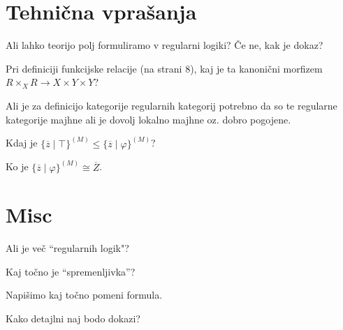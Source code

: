 \documentclass[12pt,a4paper]{article}
\newcommand\ans{\item[\textbf{A:}]}
\begin{document}
    \section*{Tehnična vprašanja}
    \begin{vprasanja}
        \item Ali lahko teorijo polj formuliramo v regularni logiki? Če ne, kak je dokaz?
        \ans
        \item Pri definiciji funkcijske relacije (na strani 8), kaj je ta kanonični morfizem $R \times_X R \to X \times Y \times Y$?
        \ans
        \item Ali je za definicijo kategorije regularnih kategorij potrebno da so te regularne kategorije majhne ali je dovolj lokalno majhne oz. dobro pogojene.
        \ans
        \item Kdaj je $\lbrace \overline{z} \mid \top \rbrace^{(M)} \leq \lbrace \overline{z} \mid \varphi \rbrace^{(M)}$?
        \ans Ko je $\lbrace \overline{z} \mid \varphi \rbrace^{(M)} \cong \overline{Z}$.
    \end{vprasanja}

    \section*{Misc}
    \begin{vprasanja}
        \item Ali je več ``regularnih logik"?
        \ans
        \item Kaj točno je ``spremenljivka''?
        \ans
        \item Napišimo kaj točno pomeni formula.
        \ans
        \item Kako detajlni naj bodo dokazi?
        \ans
    \end{vprasanja}
\end{document}

